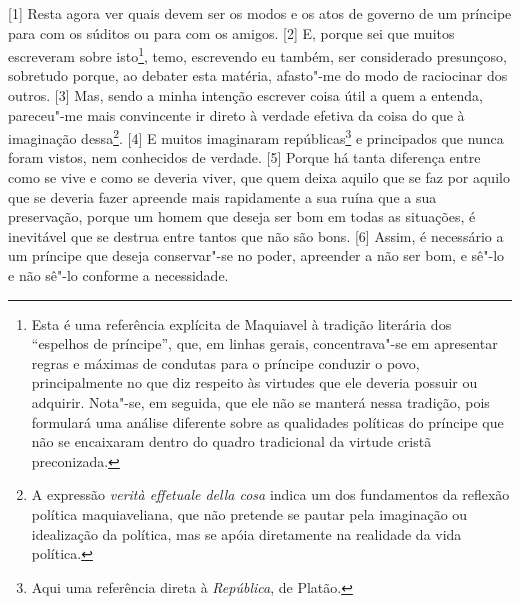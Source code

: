 {[}1{]} Resta agora ver quais devem ser os modos e os atos de governo de
um príncipe para com os súditos ou para com os amigos. {[}2{]} E, porque
sei que muitos escreveram sobre isto\footnote{Esta é uma referência
  explícita de Maquiavel à tradição literária dos ``espelhos de
  príncipe'', que, em linhas gerais, concentrava"-se em apresentar regras
  e máximas de condutas para o príncipe conduzir o povo, principalmente
  no que diz respeito às virtudes que ele deveria possuir ou adquirir.
  Nota"-se, em seguida, que ele não se manterá nessa tradição, pois
  formulará uma análise diferente sobre as qualidades políticas do
  príncipe que não se encaixaram dentro do quadro tradicional da virtude
  cristã preconizada.}, temo, escrevendo eu também, ser considerado
presunçoso, sobretudo porque, ao debater esta matéria, afasto"-me do modo
de raciocinar dos outros. {[}3{]} Mas, sendo a minha intenção escrever
coisa útil a quem a entenda, pareceu"-me mais convincente ir direto à
verdade efetiva da coisa do que à imaginação dessa\footnote{A expressão
  \emph{verità effetuale della cosa} indica um dos fundamentos da
  reflexão política maquiaveliana, que não pretende se pautar pela
  imaginação ou idealização da política, mas se apóia diretamente na
  realidade da vida política.}. {[}4{]} E muitos imaginaram
repúblicas\footnote{Aqui uma referência direta à \emph{República}, de
  Platão.} e principados que nunca foram vistos, nem conhecidos de
verdade. {[}5{]} Porque há tanta diferença entre como se vive e como se
deveria viver, que quem deixa aquilo que se faz por aquilo que se
deveria fazer apreende mais rapidamente a sua ruína que a sua
preservação, porque um homem que deseja ser bom em todas as situações, é
inevitável que se destrua entre tantos que não são bons. {[}6{]} Assim,
é necessário a um príncipe que deseja conservar"-se no poder, apreender a
não ser bom, e sê"-lo e não sê"-lo conforme a necessidade.

